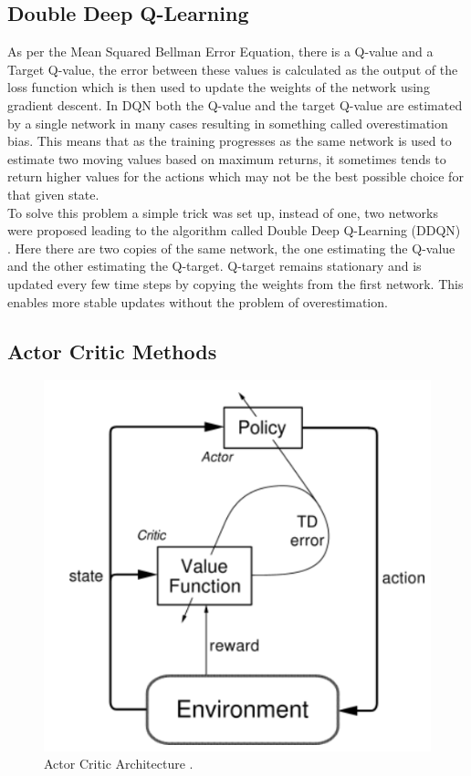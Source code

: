 \subsection{Double Deep Q-Learning}

As per the Mean Squared Bellman Error Equation, there is a Q-value and a Target Q-value, the error between these values is calculated as the output of the loss function which is then used to update the weights of the network using gradient descent. In DQN both the Q-value and the target Q-value are estimated by a single network in many cases resulting in something called overestimation bias. This means that as the training progresses as the same network is used to estimate two moving values based on maximum returns, it sometimes tends to return higher values for the actions which may not be the best possible choice for that given state. \\

To solve this problem a simple trick was set up, instead of one, two networks were proposed leading to the algorithm called Double Deep Q-Learning (DDQN) \cite{vanhasselt2015deep}. Here there are two copies of the same network, the one estimating the Q-value and the other estimating the Q-target. Q-target remains stationary and is updated every few time steps by copying the weights from the first network. This enables more stable updates without the problem of overestimation. \\

\subsection{Actor Critic Methods}

\begin{figure}[h!]
    \centering
    \includegraphics[width=\textwidth]{images/AC.png}
    \caption{Actor Critic Architecture \cite{Konda00actor-criticalgorithms}.}
    \label{fig:AC}
\end{figure}


